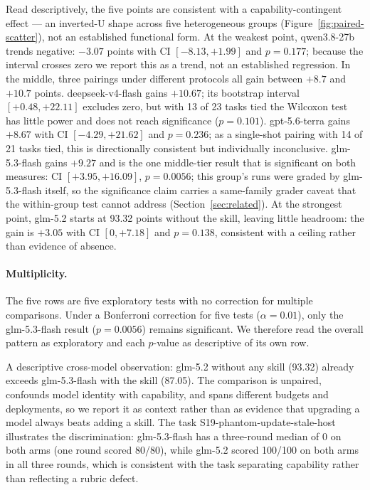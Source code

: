 \documentclass[11pt]{article}
\begin{document}
Read descriptively, the five points are consistent with a capability-contingent effect --- an inverted-U shape across five heterogeneous groups (Figure~\ref{fig:paired-scatter}), not an established functional form.
At the weakest point, qwen3.8-27b trends negative: $-3.07$ points with CI $[-8.13, +1.99]$ and $p = 0.177$; because the interval crosses zero we report this as a trend, not an established regression.
In the middle, three pairings under different protocols all gain between $+8.7$ and $+10.7$ points.
deepseek-v4-flash gains $+10.67$; its bootstrap interval $[+0.48, +22.11]$ excludes zero, but with 13 of 23 tasks tied the Wilcoxon test has little power and does not reach significance ($p = 0.101$).
gpt-5.6-terra gains $+8.67$ with CI $[-4.29, +21.62]$ and $p = 0.236$; as a single-shot pairing with 14 of 21 tasks tied, this is directionally consistent but individually inconclusive.
glm-5.3-flash gains $+9.27$ and is the one middle-tier result that is significant on both measures: CI $[+3.95, +16.09]$, $p = 0.0056$; this group's runs were graded by glm-5.3-flash itself, so the significance claim carries a same-family grader caveat that the within-group test cannot address (Section~\ref{sec:related}).
At the strongest point, glm-5.2 starts at 93.32 points without the skill, leaving little headroom: the gain is $+3.05$ with CI $[0, +7.18]$ and $p = 0.138$, consistent with a ceiling rather than evidence of absence.

\paragraph{Multiplicity.}
The five rows are five exploratory tests with no correction for multiple comparisons.
Under a Bonferroni correction for five tests ($\alpha = 0.01$), only the glm-5.3-flash result ($p = 0.0056$) remains significant.
We therefore read the overall pattern as exploratory and each $p$-value as descriptive of its own row.

A descriptive cross-model observation: glm-5.2 without any skill (93.32) already exceeds glm-5.3-flash with the skill (87.05).
The comparison is unpaired, confounds model identity with capability, and spans different budgets and deployments, so we report it as context rather than as evidence that upgrading a model always beats adding a skill.
The task S19-phantom-update-stale-host illustrates the discrimination: glm-5.3-flash has a three-round median of 0 on both arms (one round scored 80/80), while glm-5.2 scored 100/100 on both arms in all three rounds, which is consistent with the task separating capability rather than reflecting a rubric defect.
\end{document}
